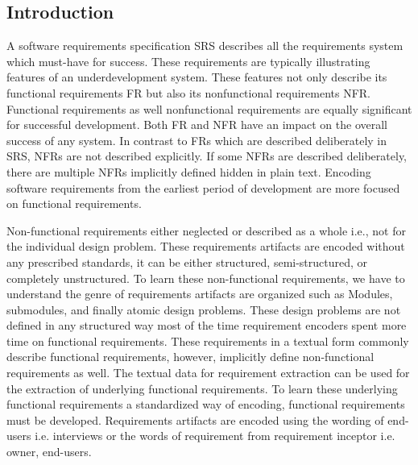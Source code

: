 \subsection{Introduction}

A software requirements specification SRS describes all the requirements system which must-have for success.
These requirements are typically illustrating features of an underdevelopment system. These features not only
describe its functional requirements FR but also its nonfunctional requirements NFR. Functional requirements
as well nonfunctional requirements are equally significant for successful development. Both FR and NFR have
an impact on the overall success of any system. In contrast to FRs which are described deliberately in SRS,
NFRs are not described explicitly. If some NFRs are described deliberately, there are multiple NFRs implicitly
defined hidden in plain text. Encoding software requirements from the earliest period of development are 
more focused on functional requirements.

\hspace{10mm}Non-functional requirements either neglected or described as a whole
i.e., not for the individual design problem. These requirements artifacts are encoded without any prescribed
standards, it can be either structured, semi-structured, or completely unstructured. To learn
these non-functional requirements, we have to understand the genre of requirements artifacts are organized 
such as Modules, submodules, and finally atomic design problems. These design problems are not defined in any
structured way most of the time requirement encoders spent more time on functional requirements. These 
requirements in a textual form commonly describe functional requirements, however, implicitly define non-functional
requirements as well. The textual data for requirement extraction can be used for the extraction of underlying functional
requirements. To learn these underlying functional requirements a standardized way of encoding, functional
requirements must be developed. Requirements artifacts are encoded using the wording of end-users i.e. interviews 
or the words of requirement from requirement inceptor i.e. owner, end-users.


